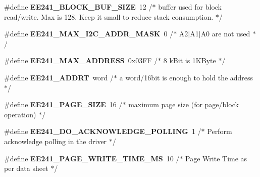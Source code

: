 \begin{DoxyCompactItemize}
\item 
\hypertarget{group___e_e241__module_ga4bfb2ada066f21d1c5b6bb9c8863b73b}{\#define {\bfseries E\-E241\-\_\-\-B\-L\-O\-C\-K\-\_\-\-B\-U\-F\-\_\-\-S\-I\-Z\-E}~12         /$\ast$ buffer used for block read/write. Max is 128. Keep it small to reduce stack consumption. $\ast$/}\label{group___e_e241__module_ga4bfb2ada066f21d1c5b6bb9c8863b73b}

\item 
\hypertarget{group___e_e241__module_gabc852017da07f3cb24ad0a79e80f8380}{\#define {\bfseries E\-E241\-\_\-\-M\-A\-X\-\_\-\-I2\-C\-\_\-\-A\-D\-D\-R\-\_\-\-M\-A\-S\-K}~0     /$\ast$ A2$|$A1$|$A0 are not used $\ast$/}\label{group___e_e241__module_gabc852017da07f3cb24ad0a79e80f8380}

\item 
\hypertarget{group___e_e241__module_ga561d89197fb00fd1b12c2239de4efa3f}{\#define {\bfseries E\-E241\-\_\-\-M\-A\-X\-\_\-\-A\-D\-D\-R\-E\-S\-S}~0x03\-F\-F /$\ast$ 8 k\-Bit is 1\-K\-Byte $\ast$/}\label{group___e_e241__module_ga561d89197fb00fd1b12c2239de4efa3f}

\item 
\hypertarget{group___e_e241__module_gac958865424df30a535737ca3a5aea7e4}{\#define {\bfseries E\-E241\-\_\-\-A\-D\-D\-R\-T}~word  /$\ast$ a word/16bit is enough to hold the address $\ast$/}\label{group___e_e241__module_gac958865424df30a535737ca3a5aea7e4}

\item 
\hypertarget{group___e_e241__module_ga235fba3b11ace602f066327d9002b7b8}{\#define {\bfseries E\-E241\-\_\-\-P\-A\-G\-E\-\_\-\-S\-I\-Z\-E}~16    /$\ast$ maximum page size (for page/block operation) $\ast$/}\label{group___e_e241__module_ga235fba3b11ace602f066327d9002b7b8}

\item 
\hypertarget{group___e_e241__module_gac46a6bd169d0e5fd4779589483be78cb}{\#define {\bfseries E\-E241\-\_\-\-D\-O\-\_\-\-A\-C\-K\-N\-O\-W\-L\-E\-D\-G\-E\-\_\-\-P\-O\-L\-L\-I\-N\-G}~1 /$\ast$ Perform acknowledge polling in the driver $\ast$/}\label{group___e_e241__module_gac46a6bd169d0e5fd4779589483be78cb}

\item 
\hypertarget{group___e_e241__module_ga15dd6a889c3d46be4b900a9e5e7b5134}{\#define {\bfseries E\-E241\-\_\-\-P\-A\-G\-E\-\_\-\-W\-R\-I\-T\-E\-\_\-\-T\-I\-M\-E\-\_\-\-M\-S}~10 /$\ast$ Page Write Time as per data sheet $\ast$/}\label{group___e_e241__module_ga15dd6a889c3d46be4b900a9e5e7b5134}


\end{DoxyCompactItemize}
